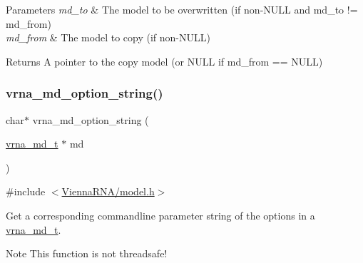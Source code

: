 \begin{DoxyParams}{Parameters}
{\em md\+\_\+to} & The model to be overwritten (if non-\/\+N\+U\+LL and {\ttfamily md\+\_\+to} != {\ttfamily md\+\_\+from}) \\
\hline
{\em md\+\_\+from} & The model to copy (if non-\/\+N\+U\+LL) \\
\hline
\end{DoxyParams}
\begin{DoxyReturn}{Returns}
A pointer to the copy model (or N\+U\+LL if {\ttfamily md\+\_\+from} == N\+U\+LL) 
\end{DoxyReturn}
\mbox{\label{group__model__details_ga3a7469f0725a849af6ba61a57dfd60ce}} 
\subsubsection{\texorpdfstring{vrna\+\_\+md\+\_\+option\+\_\+string()}{vrna\_md\_option\_string()}}
{\footnotesize\ttfamily char$\ast$ vrna\+\_\+md\+\_\+option\+\_\+string (\begin{DoxyParamCaption}\item[{\mbox{\hyperlink{group__model__details_ga1f8a10e12a0a1915f2a4eff0b28ea17c}{vrna\+\_\+md\+\_\+t}} $\ast$}]{md }\end{DoxyParamCaption})}



{\ttfamily \#include $<$\mbox{\hyperlink{model_8h}{Vienna\+R\+N\+A/model.\+h}}$>$}



Get a corresponding commandline parameter string of the options in a \mbox{\hyperlink{group__model__details_ga1f8a10e12a0a1915f2a4eff0b28ea17c}{vrna\+\_\+md\+\_\+t}}. 

\begin{DoxyNote}{Note}
This function is not threadsafe! 
\end{DoxyNote}
\mbox{\label{group__model__details_ga87398a419421bf5d90f246382e6ed70c}} 

